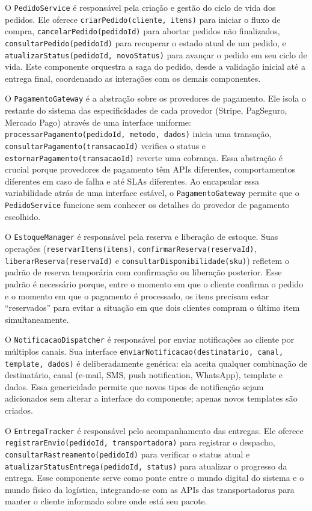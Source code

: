 O \texttt{PedidoService} é responsável pela criação e gestão do ciclo de vida dos
pedidos. Ele oferece \texttt{criarPedido(cliente, itens)} para iniciar o fluxo de
compra, \texttt{cancelarPedido(pedidoId)} para abortar pedidos não finalizados,
\texttt{consultarPedido(pedidoId)} para recuperar o estado atual de um pedido, e
\texttt{atualizarStatus(pedidoId, novoStatus)} para avançar o pedido em seu ciclo
de vida. Este componente orquestra a saga do pedido, desde a validação
inicial até a entrega final, coordenando as interações com os demais
componentes.

O \texttt{PagamentoGateway} é a abstração sobre os provedores de pagamento. Ele
isola o restante do sistema das especificidades de cada provedor (Stripe, PagSeguro,
Mercado Pago) através de uma interface uniforme: \texttt{processarPagamento(pedidoId,
metodo, dados)} inicia uma transação, \texttt{consultarPagamento(transacaoId)}
verifica o status e \texttt{estornarPagamento(transacaoId)} reverte uma cobrança.
Essa abstração é crucial porque provedores de pagamento têm APIs diferentes,
comportamentos diferentes em caso de falha e até SLAs diferentes. Ao encapsular
essa variabilidade atrás de uma interface estável, o \texttt{PagamentoGateway}
permite que o \texttt{PedidoService} funcione sem conhecer os detalhes do
provedor de pagamento escolhido.

O \texttt{EstoqueManager} é responsável pela reserva e liberação de estoque. Suas
operações (\texttt{reservarItens(itens)}, \texttt{confirmarReserva(reservaId)},
\texttt{liberarReserva(reservaId)} e \texttt{consultarDisponibilidade(sku)})
refletem o padrão de reserva temporária com confirmação ou liberação posterior.
Esse padrão é necessário porque, entre o momento em que o cliente confirma o pedido
e o momento em que o pagamento é processado, os itens precisam estar ``reservados''
para evitar a situação em que dois clientes compram o último item simultaneamente.

O \texttt{NotificacaoDispatcher} é responsável por enviar notificações ao cliente
por múltiplos canais. Sua interface \texttt{enviarNotificacao(destinatario, canal,
template, dados)} é deliberadamente genérica: ela aceita qualquer combinação de
destinatário, canal (e-mail, SMS, push notification, WhatsApp), template e dados.
Essa genericidade permite que novos tipos de notificação sejam adicionados sem
alterar a interface do componente; apenas novos templates são criados.

O \texttt{EntregaTracker} é responsável pelo acompanhamento das entregas. Ele
oferece \texttt{registrarEnvio(pedidoId, transportadora)} para registrar o despacho,
\texttt{consultarRastreamento(pedidoId)} para verificar o status atual e
\texttt{atualizarStatusEntrega(pedidoId, status)} para atualizar o progresso da
entrega. Esse componente serve como ponte entre o mundo digital do sistema e o
mundo físico da logística, integrando-se com as APIs das transportadoras para
manter o cliente informado sobre onde está seu pacote.

